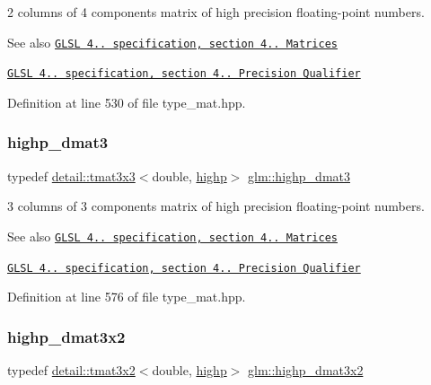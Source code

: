 2 columns of 4 components matrix of high precision floating-\/point numbers.

\begin{DoxySeeAlso}{See also}
\href{http://www.opengl.org/registry/doc/GLSLangSpec.4.20.8.pdf}{\tt G\+L\+SL 4.. specification, section 4.. Matrices} 

\href{http://www.opengl.org/registry/doc/GLSLangSpec.4.20.8.pdf}{\tt G\+L\+SL 4.. specification, section 4.. Precision Qualifier} 
\end{DoxySeeAlso}


Definition at line 530 of file type\+\_\+mat.\+hpp.

\mbox{\label{group__core__precision_ga993461e1d2caf19abd4f64d02ccdafa9}} 
\subsubsection{\texorpdfstring{highp\+\_\+dmat3}{highp\_dmat3}}
{\footnotesize\ttfamily typedef \hyperlink{structglm_1_1detail_1_1tmat3x3}{detail\+::tmat3x3}$<$double, \hyperlink{namespaceglm_a0f04f086094c747d227af4425893f545ac6f7eab42eacbb10d59a58e95e362074}{highp}$>$ \hyperlink{group__core__precision_ga993461e1d2caf19abd4f64d02ccdafa9}{glm\+::highp\+\_\+dmat3}}

3 columns of 3 components matrix of high precision floating-\/point numbers.

\begin{DoxySeeAlso}{See also}
\href{http://www.opengl.org/registry/doc/GLSLangSpec.4.20.8.pdf}{\tt G\+L\+SL 4.. specification, section 4.. Matrices} 

\href{http://www.opengl.org/registry/doc/GLSLangSpec.4.20.8.pdf}{\tt G\+L\+SL 4.. specification, section 4.. Precision Qualifier} 
\end{DoxySeeAlso}


Definition at line 576 of file type\+\_\+mat.\+hpp.

\mbox{\label{group__core__precision_gac956fe6b946f0ccee78367ccd5427351}} 
\subsubsection{\texorpdfstring{highp\+\_\+dmat3x2}{highp\_dmat3x2}}
{\footnotesize\ttfamily typedef \hyperlink{structglm_1_1detail_1_1tmat3x2}{detail\+::tmat3x2}$<$double, \hyperlink{namespaceglm_a0f04f086094c747d227af4425893f545ac6f7eab42eacbb10d59a58e95e362074}{highp}$>$ \hyperlink{group__core__precision_gac956fe6b946f0ccee78367ccd5427351}{glm\+::highp\+\_\+dmat3x2}}

